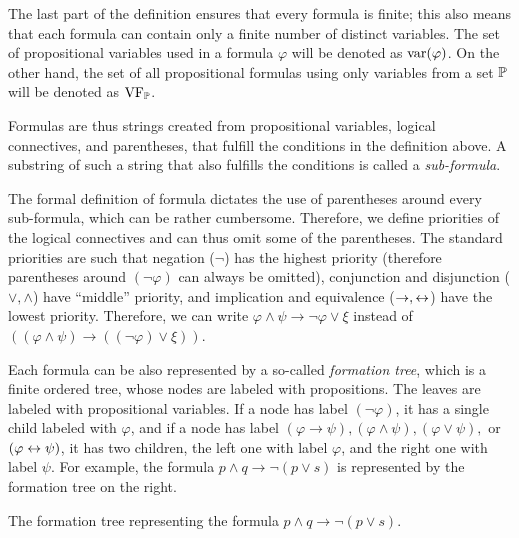 The last part of the definition ensures that every formula is finite; this also means that each formula can contain only a finite number of distinct variables. The set of propositional variables used in a formula $\varphi$ will be denoted as $\operatorname{var}(\varphi)$. On the other hand, the set of all propositional formulas using only variables from a set $\mathbb{P}$ will be denoted as $\operatorname{VF}_\mathbb{P}$.

Formulas are thus strings created from propositional variables, logical connectives, and parentheses, that fulfill the conditions in the definition above. A substring of such a string that also fulfills the conditions is called a \emph{sub-formula}. 

The formal definition of formula dictates the use of parentheses around every sub-formula, which can be rather cumbersome. Therefore, we define priorities of the logical connectives and can thus omit some of the parentheses. The standard priorities are such that negation ($\neg$) has the highest priority (therefore parentheses around $(\neg \varphi)$ can always be omitted), conjunction and disjunction ($\lor, \land$) have ``middle'' priority, and implication and equivalence ($\to, \leftrightarrow$) have the lowest priority. Therefore, we can write $\varphi \land \psi \to \neg \varphi \lor \xi$ instead of $((\varphi \land \psi) \to ((\neg \varphi) \lor \xi))$. 

Each formula can be also represented by a so-called \emph{formation tree}, which is a finite ordered tree, whose nodes are labeled with propositions. The leaves are labeled with propositional variables. If a node has label $(\neg \varphi)$, it has a single child labeled with $\varphi$, and if a node has label $(\varphi \to \psi), (\varphi \land \psi), (\varphi \lor \psi),$ or $(\varphi \leftrightarrow \psi)$, it has two children, the left one with label $\varphi$, and the right one with label $\psi$. For example, the formula $p \land q \to \neg (p \lor s)$ is represented by the formation tree on the right.
\begin{marginfigure}[-4\baselineskip]
\centering
{}
\caption{The formation tree representing the formula $p \land q \to \neg (p \lor s)$.}
\end{marginfigure}

